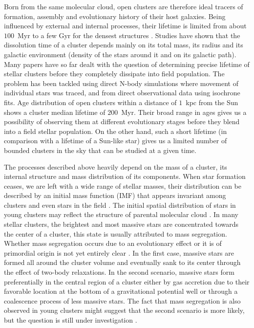 Born from the same molecular cloud, open clusters are therefore ideal tracers of formation, assembly and evolutionary history of their host galaxies. Being influenced by external and internal processes, their lifetime is limited from about $100$~Myr to a few Gyr for the densest structures \cite{1998A&A...337..363P, 2013MNRAS.434.2509M}. Studies have shown that the dissolution time of a cluster depends mainly on its total mass, its radius and its galactic environment (density of the stars around it and on its galactic path). Many papers have so far dealt with the question of determining precise lifetime of stellar clusters before they completely dissipate into field population. The problem has been tackled using direct N-body simulations \cite{1998A&A...337..363P} where movement of individual stars was traced, and from direct observational data \cite{1971Ap&SS..13..300W, 1988IAUS..126..393W, 2019MNRAS.487.2385M, 2019A&A...623A.108B} using isochrone fits. Age distribution of open clusters within a distance of $1$~kpc from the Sun shows a cluster median lifetime of $200$~Myr. Their broad range in ages gives us a possibility of observing them at different evolutionary stages \cite{2006BASI...34..153C, 2007A&A...468..139P} before they blend \cite{2001A&A...366..827B} into a field stellar population. On the other hand, such a short lifetime (in comparison with a lifetime of a Sun-like star) gives us a limited number of bounded clusters in the sky that can be studied at a given time.

The processes described above heavily depend on the mass of a cluster, its internal structure and mass distribution of its components. When star formation ceases, we are left with a wide range of stellar masses, their distribution can be described by an initial mass function (IMF) \cite{1955ApJ...121..161S, 1986FCPh...11....1S, 2003PASP..115..763C} that appears invariant among clusters and even stars in the field \cite{2001MNRAS.322..231K}. The initial spatial distribution of stars in young clusters may reflect the structure of parental molecular cloud \cite{2015MNRAS.448.1847H}. In many stellar clusters, the brightest and most massive stars are concentrated towards the center of a cluster, this state is usually attributed to mass segregation. Whether mass segregation occurs due to an evolutionary effect or it is of primordial origin is not yet entirely clear \cite{1998A&A...333..897R, 1998MNRAS.295..691B, 2002MNRAS.331..245D, 2003A&A...405..525B}. In the first case, massive stars are formed all around the cluster volume and eventually sank to its center through the effect of two-body relaxations. In the second scenario, massive stars form preferentially in the central region of a cluster either by gas accretion due to their favorable location at the bottom of a gravitational potential well or through a coalescence process of less massive stars. The fact that mass segregation is also observed in young clusters might suggest that the second scenario is more likely, but the question is still under investigation \cite{2018MNRAS.473..849D}.

